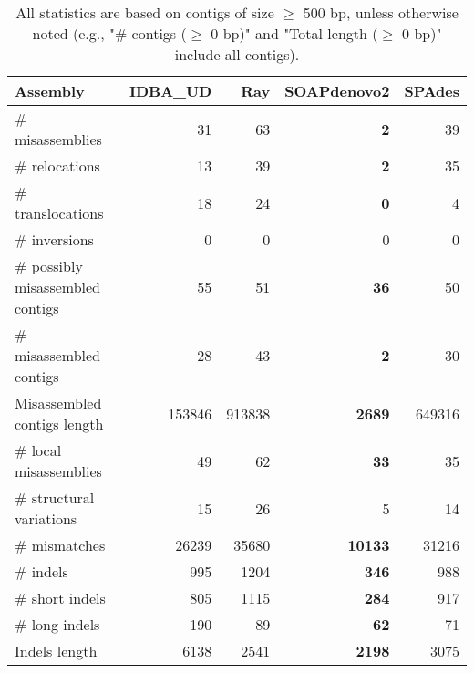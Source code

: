 \documentclass[12pt,a4paper]{article}
\begin{document}
\begin{table}[ht]
\begin{center}
\caption{All statistics are based on contigs of size $\geq$ 500 bp, unless otherwise noted (e.g., "\# contigs ($\geq$ 0 bp)" and "Total length ($\geq$ 0 bp)" include all contigs).}
\begin{tabular}{|l*{4}{|r}|}
\hline
Assembly & IDBA\_UD & Ray & SOAPdenovo2 & SPAdes \\ \hline
\# misassemblies & 31 & 63 & {\bf 2} & 39 \\ \hline
\hspace{5mm}\# relocations & 13 & 39 & {\bf 2} & 35 \\ \hline
\hspace{5mm}\# translocations & 18 & 24 & {\bf 0} & 4 \\ \hline
\hspace{5mm}\# inversions & 0 & 0 & 0 & 0 \\ \hline
\# possibly misassembled contigs & 55 & 51 & {\bf 36} & 50 \\ \hline
\# misassembled contigs & 28 & 43 & {\bf 2} & 30 \\ \hline
Misassembled contigs length & 153846 & 913838 & {\bf 2689} & 649316 \\ \hline
\# local misassemblies & 49 & 62 & {\bf 33} & 35 \\ \hline
\# structural variations & 15 & 26 & 5 & 14 \\ \hline
\# mismatches & 26239 & 35680 & {\bf 10133} & 31216 \\ \hline
\# indels & 995 & 1204 & {\bf 346} & 988 \\ \hline
\hspace{5mm}\# short indels & 805 & 1115 & {\bf 284} & 917 \\ \hline
\hspace{5mm}\# long indels & 190 & 89 & {\bf 62} & 71 \\ \hline
Indels length & 6138 & 2541 & {\bf 2198} & 3075 \\ \hline
\end{tabular}
\end{center}
\end{table}
\end{document}
